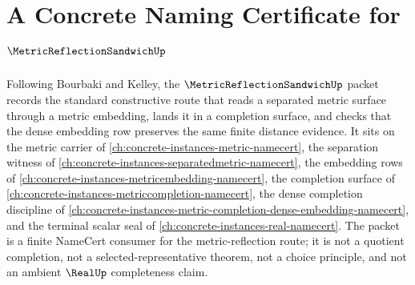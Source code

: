 \chapter{A Concrete Naming Certificate for $\MetricReflectionSandwichUp$}
\label{ch:concrete-instances-metric-reflection-sandwich-namecert}

Following Bourbaki and Kelley, the $\MetricReflectionSandwichUp$ packet records the standard constructive route that reads a separated metric surface through a metric embedding, lands it in a completion surface, and checks that the dense embedding row preserves the same finite distance evidence. It sits on the metric carrier of \autoref{ch:concrete-instances-metric-namecert}, the separation witness of \autoref{ch:concrete-instances-separatedmetric-namecert}, the embedding rows of \autoref{ch:concrete-instances-metricembedding-namecert}, the completion surface of \autoref{ch:concrete-instances-metriccompletion-namecert}, the dense completion discipline of \autoref{ch:concrete-instances-metric-completion-dense-embedding-namecert}, and the terminal scalar seal of \autoref{ch:concrete-instances-real-namecert}. The packet is a finite NameCert consumer for the metric-reflection route; it is not a quotient completion, not a selected-representative theorem, not a choice principle, and not an ambient $\RealUp$ completeness claim.

